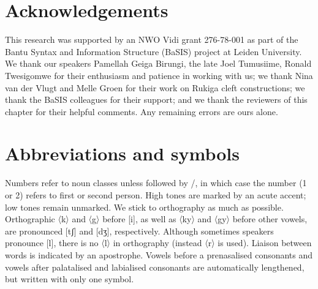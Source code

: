 \documentclass[output=paper]{langscibook}
\begin{document}
\section*{Acknowledgements}\label{sec:acknowledgements}

This research was supported by an NWO Vidi grant 276-78-001 as part of the Bantu Syntax and Information Structure (BaSIS) project at Leiden University. We thank our speakers Pamellah Geiga Birungi, the late Joel Tumusiime, Ronald Twesigomwe for their enthusiasm and patience in working with us; we thank Nina van der Vlugt and Melle Groen for their work on Rukiga cleft constructions; we thank the BaSIS colleagues for their support; and we thank the reviewers of this chapter for their helpful comments. Any remaining errors are ours alone.

\section*{Abbreviations and symbols}\label{sec:abbsymbs}

Numbers refer to noun classes unless followed by \SG{}/\PL{}, in which case the number (1 or 2) refers to first or second person. High tones are marked by an acute accent; low tones remain unmarked. We stick to orthography as much as possible. Orthographic 〈k〉 and 〈g〉 before [i], as well as 〈ky〉 and 〈gy〉 before other vowels, are pronounced [tʃ] and [dʒ], respectively. Although sometimes speakers pronounce [l], there is no 〈l〉 in orthography (instead 〈r〉 is used). Liaison between words is indicated by an apostrophe. Vowels before a prenasalised consonants and vowels after palatalised and labialised consonants are automatically lengthened, but written with only one symbol.
\end{document}
